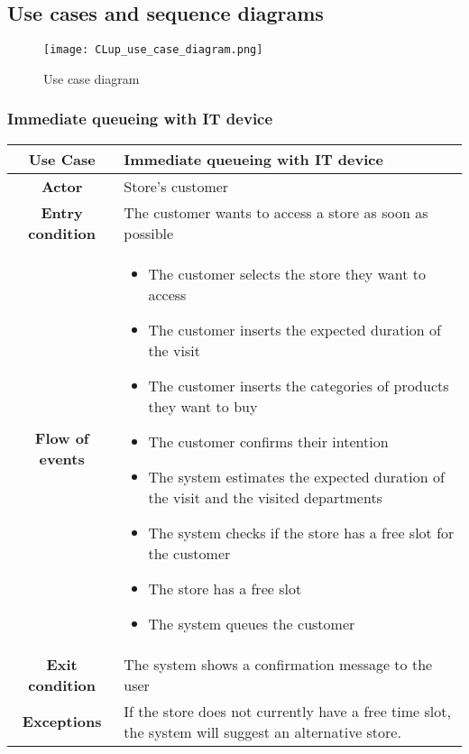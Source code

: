 \documentclass[../../main.tex]{subfiles}
\begin{document}
    \subsection{Use cases and sequence diagrams}

      \begin{figure}[H]
        \centering
        \texttt{[image: CLup\_use\_case\_diagram.png]}
        \caption{Use case diagram}
      \end{figure}

      \subsubsection{Immediate queueing with IT device}

      \begin{table}[H]
        \centering
          \begin{tabular}{c m{}}
          \hline
          \textbf{Use Case} & Immediate queueing with IT device\\ \hline
          \textbf{Actor} & Store's customer\\ \hline
          \textbf{Entry condition} & The customer wants to access a store as soon as possible\\  \hline
          \textbf{Flow of events} & \begin{itemize}
                                      \item The customer selects the store they want to access
                                      \item The customer inserts the expected duration of the visit
                                      \item The customer inserts the categories of products they want to buy
                                      \item The customer confirms their intention
                                      \item The system estimates the expected duration of the visit and the visited departments
                                      \item The system checks if the store has a free slot for the customer
                                      \item The store has a free slot
                                      \item The system queues the customer
                                    \end{itemize}\\ \hline
          \textbf{Exit condition} & The system shows a confirmation message to the user \\ \hline
          \textbf{Exceptions} &  If the store does not currently have a free time slot, the system will suggest an alternative store.
                                  

\end{tabular}
\end{table}
\end{document}

